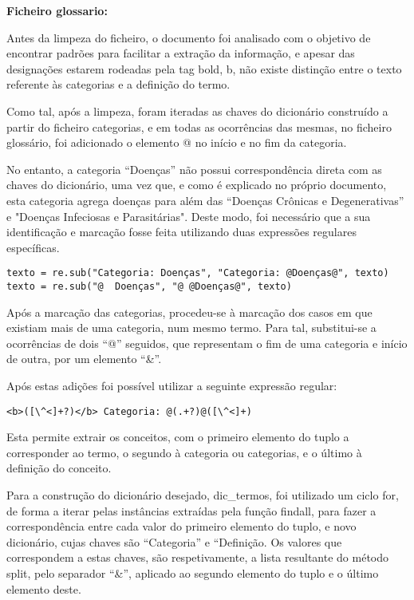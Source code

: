 \textbf{Ficheiro glossario:}

Antes da limpeza do ficheiro, o documento foi analisado com o objetivo de encontrar padrões para facilitar a extração da informação, e apesar das designações estarem rodeadas pela tag bold, b, não existe distinção entre o texto referente às categorias e a definição do termo.

Como tal, após a limpeza, foram iteradas as chaves do dicionário construído a partir do ficheiro categorias, e em todas as ocorrências das mesmas, no ficheiro glossário, foi adicionado o elemento @ no início e no fim da categoria. 

No entanto, a categoria “Doenças” não possui correspondência direta com as chaves do dicionário, uma vez que, e como é explicado no próprio documento, esta categoria agrega doenças para além das “Doenças Crônicas e Degenerativas” e "Doenças Infeciosas e Parasitárias". Deste modo, foi necessário que a sua identificação e marcação fosse feita utilizando duas expressões regulares específicas.\\

\begin{lstlisting}[style=pythonstyle]
texto = re.sub("Categoria: Doenças", "Categoria: @Doenças@", texto)
texto = re.sub("@  Doenças", "@ @Doenças@", texto)
\end{lstlisting}

Após a marcação das categorias, procedeu-se à marcação dos casos em que existiam mais de uma categoria, num mesmo termo. Para tal, substitui-se a ocorrências de dois “@” seguidos, que representam o fim de uma categoria e início de outra, por um elemento “\&”.

Após estas adições foi possível utilizar a seguinte expressão regular: 
\begin{lstlisting}[style=pythonstyle]
<b>([\^<]+?)</b> Categoria: @(.+?)@([\^<]+)
\end{lstlisting}
Esta permite extrair os conceitos, com o primeiro elemento do tuplo a corresponder ao termo, o segundo à categoria ou categorias, e o último à definição do conceito.

Para a construção do dicionário desejado, dic\_termos, foi utilizado um ciclo for, de forma a iterar pelas instâncias extraídas pela função findall, para fazer a correspondência entre cada valor do primeiro elemento do tuplo, e novo dicionário, cujas chaves são “Categoria” e “Definição. Os valores que correspondem a estas chaves, são respetivamente, a lista resultante do método split, pelo separador “\&”, aplicado ao segundo elemento do tuplo e o último elemento deste.

